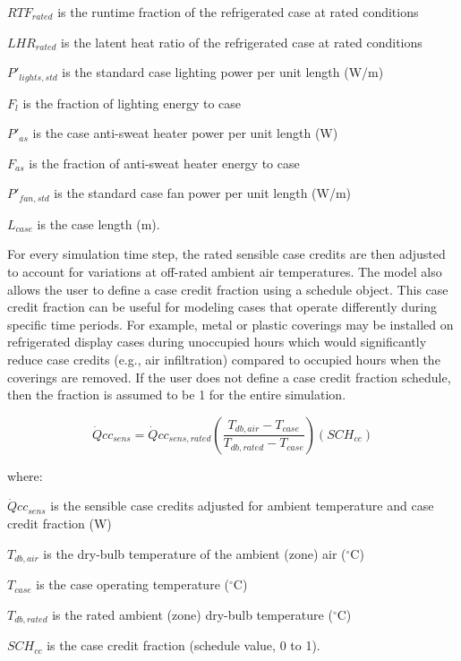\(RT{F_{rated}}\) is the runtime fraction of the refrigerated case at rated conditions

\(LH{R_{rated}}\) is the latent heat ratio of the refrigerated case at rated conditions

\({P'}_{lights,std}\) is the standard case lighting power per unit length (W/m)

\({F_l}\) is the fraction of lighting energy to case

\({P'}_{as}\) is the case anti-sweat heater power per unit length (W)

\({F_{as}}\) is the fraction of anti-sweat heater energy to case

\({P'}_{fan,std}\) is the standard case fan power per unit length (W/m)

\({L_{case}}\) is the case length (m).

For every simulation time step, the rated sensible case credits are then adjusted to account for variations at off-rated ambient air temperatures. The model also allows the user to define a case credit fraction using a schedule object. This case credit fraction can be useful for modeling cases that operate differently during specific time periods. For example, metal or plastic coverings may be installed on refrigerated display cases during unoccupied hours which would significantly reduce case credits (e.g., air infiltration) compared to occupied hours when the coverings are removed. If the user does not define a case credit fraction schedule, then the fraction is assumed to be 1 for the entire simulation.

\begin{equation}
\dot Qc{c_{sens}} = \dot Qc{c_{sens,rated}}\left( {\frac{{{T_{db,air}} - {T_{case}}}}{{{T_{db,rated}} - {T_{case}}}}} \right)\left( {SC{H_{cc}}} \right)
\end{equation}

where:

\(\dot Qc{c_{sens}}\) is the sensible case credits adjusted for ambient temperature and case credit fraction (W)

\({T_{db,air}}\) is the dry-bulb temperature of the ambient (zone) air (\(^{\circ}\)C)

\({T_{case}}\) is the case operating temperature (\(^{\circ}\)C)

\({T_{db,rated}}\) is the rated ambient (zone) dry-bulb temperature (\(^{\circ}\)C)

\(SC{H_{cc}}\) is the case credit fraction (schedule value, 0 to 1).

